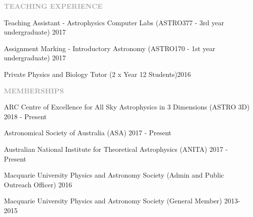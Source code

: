\documentclass[11pt]{extarticle}
\def\Vhrulefill{{\color{BurntOrange}{\leavevmode\leaders\hrule height 1.2ex depth \dimexpr0.5pt-0.9ex\hfill\kern5pt}}}
\begin{document}
\vspace{3ex}
\noindent
\textcolor{darkgray}{\Large\normalfont\bfseries\MakeUppercase{Teaching Experience}} \Vhrulefill
\vspace{2ex}

\noindent
Teaching Assistant - Astrophysics Computer Labs (ASTRO377 - 3rd year undergraduate) \hfill 2017 \par
\noindent
Assignment Marking - Introductory Astronomy (ASTRO170 - 1st year undergraduate) \hfill 2017 \par
\noindent
Private Physics and Biology Tutor (2 x Year 12 Students)\hfill 2016 \par


\vspace{3ex}
\noindent
\textcolor{darkgray}{\Large\normalfont\bfseries\MakeUppercase{Memberships}} \Vhrulefill
\vspace{2ex}

\noindent
ARC Centre of Excellence for All Sky Astrophysics in 3 Dimensions (ASTRO 3D) \hfill 2018 - Present \par
\noindent
Astronomical Society of Australia (ASA)  \hfill 2017 - Present \par
\noindent
Australian National Institute for Theoretical Astrophysics (ANITA) \hfill 2017 - Present \par
\noindent
Macquarie University Physics and Astronomy Society (Admin and Public Outreach Officer) \hfill 2016 \par
\noindent
Macquarie University Physics and Astronomy Society (General Member) \hfill 2013-2015 \par



\end{document}
